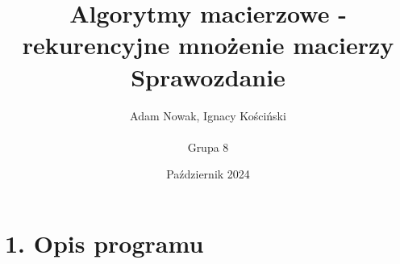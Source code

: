 \documentclass{article}
\title{Algorytmy macierzowe - rekurencyjne mnożenie macierzy\\\large Sprawozdanie}
\author{Adam Nowak, Ignacy Kościński \\\\ Grupa 8}
\date{Październik 2024}
\begin{document}
\maketitle

\section*{1. Opis programu}
\end{document}
